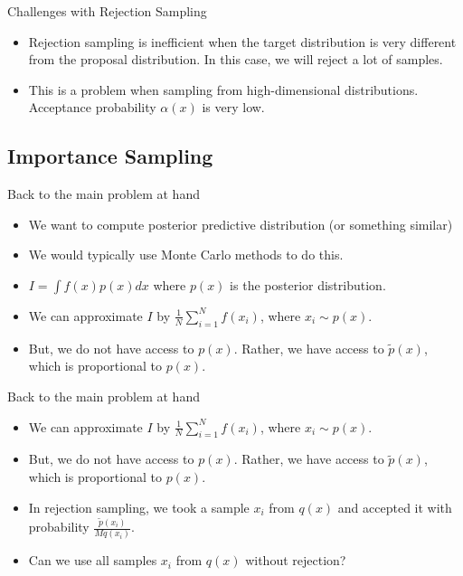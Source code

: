 \documentclass{beamer}
\begin{document}
    \begin{frame}{Challenges with Rejection Sampling}
        \begin{itemize}
            \item Rejection sampling is inefficient when the target distribution is very different from the proposal distribution. In this case, we will reject a lot of samples.
            \item This is a problem when sampling from high-dimensional distributions. Acceptance probability $\alpha(x)$ is very low.
        \end{itemize}
    \end{frame}

\subsection{Importance Sampling}

\begin{frame}{Back to the main problem at hand}
    \begin{itemize}
        \item We want to compute posterior predictive distribution (or something similar)
        \item We would typically use Monte Carlo methods to do this.
        \item $I = \int f(x) p(x) dx$ where $p(x)$ is the posterior distribution.
        \item We can approximate $I$ by $\frac{1}{N} \sum_{i=1}^N f(x_i)$, where $x_i \sim p(x)$.
        \item But, we do not have access to $p(x)$. Rather, we have access to $\tilde{p}(x)$, which is proportional to $p(x)$.
    \end{itemize}
    
\end{frame}

\begin{frame}{Back to the main problem at hand}
    \begin{itemize}
        \item We can approximate $I$ by $\frac{1}{N} \sum_{i=1}^N f(x_i)$, where $x_i \sim p(x)$.
        \item But, we do not have access to $p(x)$. Rather, we have access to $\tilde{p}(x)$, which is proportional to $p(x)$.
        \item In rejection sampling, we took a sample $x_i$ from $q(x)$ and accepted it with probability $\frac{\tilde{p}(x_i)}{M q(x_i)}$.
        \item Can we use all samples $x_i$ from $q(x)$ without rejection?
    \end{itemize}
    
\end{frame}
\end{document}

